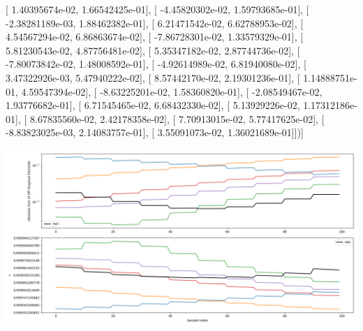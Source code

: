 \documentclass{article}
\begin{document}
       [  1.40395674e-02,   1.66542425e-01],
       [ -4.45820302e-02,   1.59793685e-01],
       [ -2.38281189e-03,   1.88462382e-01],
       [  6.21471542e-02,   6.62788953e-02],
       [  4.54567294e-02,   6.86863674e-02],
       [ -7.86728301e-02,   1.33579329e-01],
       [  5.81230543e-02,   4.87756481e-02],
       [  5.35347182e-02,   2.87744736e-02],
       [ -7.80073842e-02,   1.48008592e-01],
       [ -4.92614989e-02,   6.81940080e-02],
       [  3.47322926e-03,   5.47940222e-02],
       [  8.57442170e-02,   2.19301236e-01],
       [  1.14888751e-01,   4.59547394e-02],
       [ -8.63225201e-02,   1.58360820e-01],
       [ -2.08549467e-02,   1.93776682e-01],
       [  6.71545465e-02,   6.68432330e-02],
       [  5.13929226e-02,   1.17312186e-01],
       [  8.67835560e-02,   2.42178358e-02],
       [  7.70913015e-02,   5.77417625e-02],
       [ -8.83823025e-03,   2.14083757e-01],
       [  3.55091073e-02,   1.36021689e-01]])]
\begin{center}
\includegraphics[scale=.9]{report_pickled_controls143/control_dpn_all.png}

\end{center}
\end{document}

